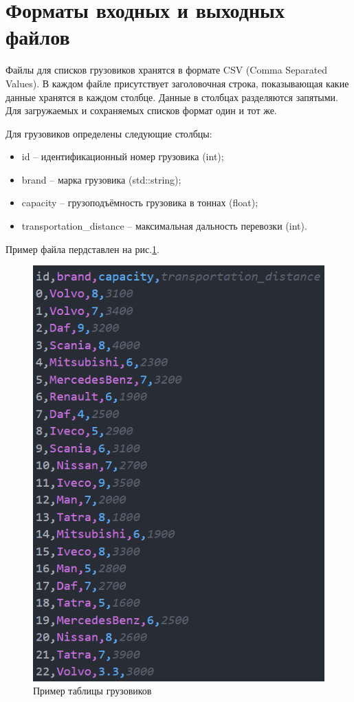 \section*{Форматы входных и выходных файлов}

Файлы для списков грузовиков хранятся в формате CSV (Comma Separated Values). 
В каждом файле присутствует заголовочная строка, 
показывающая какие данные хранятся в каждом столбце. 
Данные в столбцах разделяются запятыми.
Для загружаемых и сохраняемых списков формат один и тот же.

Для грузовиков определены следующие столбцы:
\begin{itemize}
    \item id -- идентификационный номер грузовика (int);
    \item brand -- марка грузовика (std::string);
    \item capacity -- грузоподъёмность грузовика в тоннах (float);
    \item transportation\_distance -- максимальная дальность перевозки (int).
\end{itemize}

Пример файла пердставлен на рис.\ref{file_example}.

\begin{figure}[hpt!]
    \centering
    \includegraphics[width=0.5\linewidth]{photo/file_example}
    \caption{Пример таблицы грузовиков}
    \label{file_example}
\end{figure}